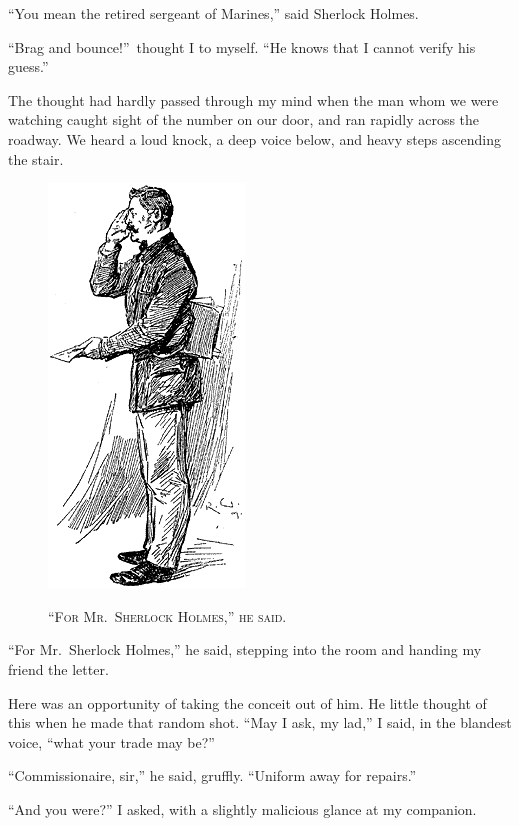\documentclass[12pt,english]{book}
\newcommand{\noun}[1]{\textsc{#1}}
\begin{document}
{}``You mean the retired sergeant of Marines,'' said Sherlock Holmes.

{}``Brag and bounce!''\ thought I to myself. {}``He knows that
I cannot verify his guess.''

The thought had hardly passed through my mind when the man whom we
were watching caught sight of the number on our door, and ran rapidly
across the roadway. We heard a loud knock, a deep voice below, and
heavy steps ascending the stair.

%
\begin{figure}[htbp]
\noindent \begin{center}\includegraphics{images/study10-stud-04.png}\end{center}

\noindent \begin{center}\noun{{}``For Mr.\ Sherlock Holmes,''
he said.}\end{center}
\end{figure}
{}``For Mr.\ Sherlock Holmes,'' he said, stepping into the room
and handing my friend the letter.

Here was an opportunity of taking the conceit out of him. He little
thought of this when he made that random shot. {}``May I ask, my
lad,'' I said, in the blandest voice, {}``what your trade may be?''

{}``Commissionaire, sir,'' he said, gruffly. {}``Uniform away for
repairs.''

{}``And you were?'' I asked, with a slightly malicious glance at
my companion.
\end{document}

